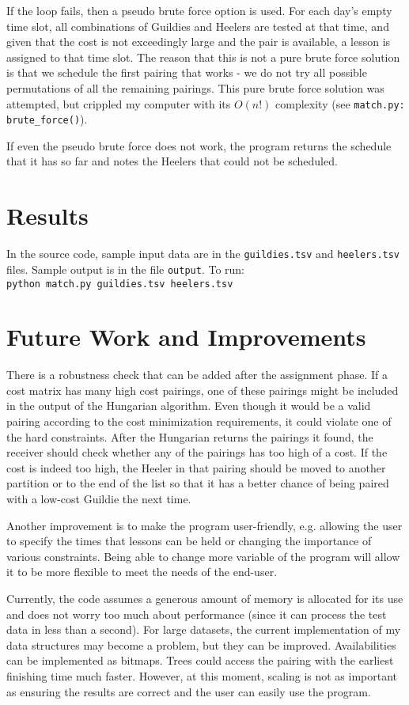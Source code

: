 \documentclass[letterpaper]{article}
\begin{document}
If the loop fails, then a pseudo brute force option is used. For each day's empty time slot, all combinations of Guildies and
Heelers are tested at that time, and given that the cost is not exceedingly large and the pair is available, a lesson is
assigned to that time slot. The reason that this is not a pure brute force solution is that we schedule the first
pairing that works - we do not try all possible permutations of all the remaining pairings. This pure brute force
solution was attempted, but crippled my computer with its $O(n!)$ complexity (see \texttt{match.py:
brute\_force()}).

If even the pseudo brute force does not work, the program returns the schedule that it has so far and notes the Heelers
that could not be scheduled.


\section{Results}
In the source code, sample input data are in the \texttt{guildies.tsv} and \texttt{heelers.tsv} files.
Sample output is in the file \texttt{output}. To run:\\

\texttt{python match.py guildies.tsv heelers.tsv}
\section{Future Work and Improvements}
There is a robustness check that can be added after the assignment phase. If a cost matrix has many high cost
pairings, one of these pairings might be included in the output of the Hungarian algorithm. Even though it would be a
valid pairing according to the cost minimization requirements, it could violate one of the hard constraints. After the
Hungarian returns the pairings it found, the receiver should check whether any of the pairings has too high of a cost.
If the cost is indeed too high, the Heeler in that pairing should be moved to another partition or to the end of the
list so that it has a better chance of being paired with a low-cost Guildie the next time. 

Another improvement is to make the program user-friendly, e.g. allowing the user to specify the times that
lessons can be held or changing the importance of various constraints. Being able to change more variable of the program
will allow it to be more flexible to meet the needs of the end-user. 

Currently, the code assumes a generous amount of memory is allocated for its use and does not worry too much about
performance (since it can process the test data in less than a second). For large datasets, the current implementation
of my data structures may become a problem, but they can be improved. Availabilities can be implemented as bitmaps.
Trees could access the pairing with the earliest finishing time much faster. However, at this moment, scaling is not as
important as ensuring the results are correct and the user can easily use the program.
\end{document}
